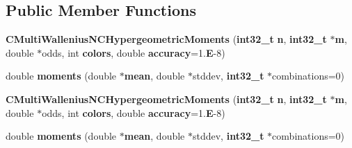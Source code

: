 \subsection*{Public Member Functions}
\begin{DoxyCompactItemize}
\item 
{\bf C\-Multi\-Wallenius\-N\-C\-Hypergeometric\-Moments} ({\bf int32\-\_\-t} {\bf n}, {\bf int32\-\_\-t} $\ast${\bf m}, double $\ast$odds, int {\bf colors}, double {\bf accuracy}=1.{\bf E}-\/8)
\item 
double {\bf moments} (double $\ast${\bf mean}, double $\ast$stddev, {\bf int32\-\_\-t} $\ast$combinations=0)
\item 
{\bf C\-Multi\-Wallenius\-N\-C\-Hypergeometric\-Moments} ({\bf int32\-\_\-t} {\bf n}, {\bf int32\-\_\-t} $\ast${\bf m}, double $\ast$odds, int {\bf colors}, double {\bf accuracy}=1.{\bf E}-\/8)
\item 
double {\bf moments} (double $\ast${\bf mean}, double $\ast$stddev, {\bf int32\-\_\-t} $\ast$combinations=0)
\end{DoxyCompactItemize}
